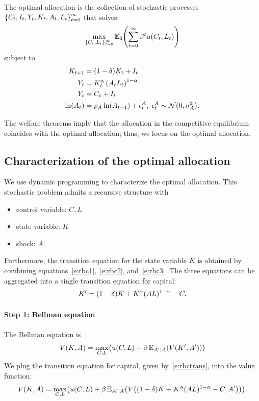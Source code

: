 \documentclass[letterpaper, 11pt, leqno]{article}
\begin{document}
\begin{definition} The optimal allocation is the collection of stochastic processes $\left\lbrace C_{t},I_{t},Y_{t},K_{t},A_{t},L_{t} \right\rbrace_{t=0}^{\infty}$ that solves:
\begin{equation*}
\max[\bc{C_{t},L_{t}}_{t=0}^{\infty}] \E[0]{\sum_{t=0}^{\infty}\b^{t} u(C_{t},L_{t})}
\end{equation*}
subject to
\begin{align}
K_{t+1} &=(1-\d) K_{t}+I_{t}\label{e:rbc1}\\
Y_{t}&=K_{t}^{\a} \bp{A_{t} L_{t}}^{1-\a}\label{e:rbc2}\\
Y_{t}&=C_{t}+I_{t}\label{e:rbc3}\\
\ln{A_{t}} &=\r_{A} \ln{A_{t-1}} +\e^{A}_{t},\;\e^{A}_{t}\sim \Nc\of{0,\s_{A}^{2}}.\nonumber
\end{align}
\end{definition}
The welfare theorems imply that the allocation in the competitive equilibrium coincides with the optimal allocation; thus, we focus on the optimal allocation.

\subsection{Characterization of the optimal allocation}

We use dynamic programming to characterize the optimal allocation. This stochastic problem admits a recursive structure with
\begin{itemize}
\item control variable: $C,L$
\item state variable: $K$
\item shock: $A$.
\end{itemize}
Furthermore, the transition equation for the state variable $K$ is obtained by combining equations~\eqref{e:rbc1},~\eqref{e:rbc2}, and~\eqref{e:rbc3}. The three equations can be aggregated into a single transition equation for capital:
\begin{equation}
K'=(1-\delta) K+K^{\alpha} (A L)^{1-\alpha}-C.
\label{e:rbctrans}\end{equation}

\paragraph{Step 1: Bellman equation} The Bellman equation is
\begin{equation*}
V(K,A) = \max[C,L]{u(C,L) +\b \E[A'\mid A]{V(K',A')}}
\end{equation*}
We plug the transition equation for capital, given by~\eqref{e:rbctrans}, into the value function:
\begin{equation*}
V(K,A) = \max[C,L]{u(C,L)+\b \E[A'\mid A]{V\of{(1-\d) K+K^{\a} (A L)^{1-\a}-C, A'}}}.
\end{equation*}
\end{document}
